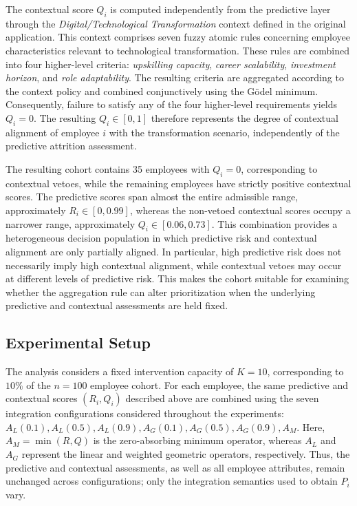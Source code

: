 \documentclass[mathematics,article,submit,moreauthors]{Definitions/mdpi}
\begin{document}
The contextual score $Q_i$ is computed independently from the predictive
layer through the \textit{Digital/Technological Transformation} context
defined in the original application. This context comprises seven fuzzy
atomic rules concerning employee characteristics relevant to technological
transformation. These rules are combined into four higher-level criteria:
\textit{upskilling capacity}, \textit{career scalability},
\textit{investment horizon}, and \textit{role adaptability}. The resulting
criteria are aggregated according to the context policy and combined
conjunctively using the Gödel minimum. Consequently, failure to satisfy any
of the four higher-level requirements yields $Q_i=0$. The resulting
$Q_i\in[0,1]$ therefore represents the degree of contextual alignment of
employee $i$ with the transformation scenario, independently of the
predictive attrition assessment.

The resulting cohort contains 35 employees with $Q_i=0$, corresponding to
contextual vetoes, while the remaining employees have strictly positive
contextual scores. The predictive scores span almost the entire admissible
range, approximately $R_i\in[0,0.99]$, whereas the non-vetoed contextual
scores occupy a narrower range, approximately $Q_i\in[0.06,0.73]$. This
combination provides a heterogeneous decision population in which
predictive risk and contextual alignment are only partially aligned. In
particular, high predictive risk does not necessarily imply high contextual
alignment, while contextual vetoes may occur at different levels of
predictive risk. This makes the cohort suitable for examining whether the
aggregation rule can alter prioritization when the underlying predictive
and contextual assessments are held fixed.

\subsection{Experimental Setup}
\label{sec:experimental-setup}

The analysis considers a fixed intervention capacity of $K=10$, corresponding to $10\%$ of the $n=100$ employee cohort. For each employee, the same predictive and contextual scores $(R_i,Q_i)$ described above are combined using the seven integration configurations considered throughout the experiments: $A_L(0.1), A_L(0.5), A_L(0.9), A_G(0.1), A_G(0.5), A_G(0.9), A_M$.
Here, $A_M=\min(R,Q)$ is the zero-absorbing minimum operator, whereas
$A_L$ and $A_G$ represent the linear and weighted geometric operators,
respectively. Thus, the predictive and contextual assessments, as well as
all employee attributes, remain unchanged across configurations; only the
integration semantics used to obtain $P_i$ vary.
\end{document}
